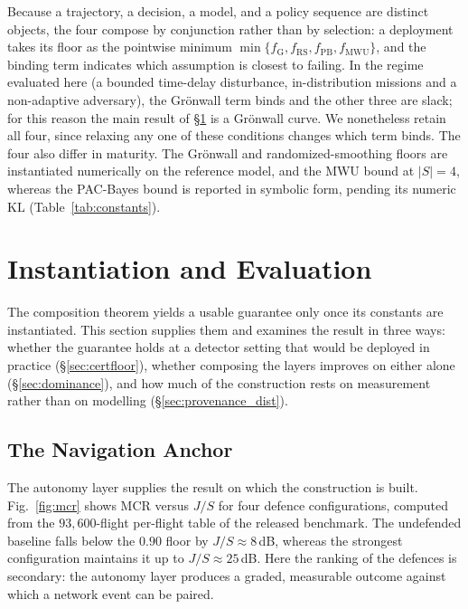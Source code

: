 Because a trajectory, a decision, a model, and a policy sequence are distinct
objects, the four compose by conjunction rather than by selection: a deployment
takes its floor as the pointwise minimum
$\min\{f_{\mathrm{G}},f_{\mathrm{RS}},f_{\mathrm{PB}},f_{\mathrm{MWU}}\}$, and
the binding term indicates which assumption is closest to failing. In the
regime evaluated here (a bounded time-delay disturbance, in-distribution
missions and a non-adaptive adversary), the Gr\"onwall term binds and the other
three are slack; for this reason the main result of \S\ref{sec:eval} is a
Gr\"onwall curve. We nonetheless retain all four, since relaxing any one of
these conditions changes which term binds. The four also differ in maturity.
The Gr\"onwall and randomized-smoothing floors are instantiated numerically on
the reference model, and the MWU bound at $|S|=4$, whereas the PAC-Bayes bound
is reported in symbolic form, pending its numeric $\mathrm{KL}$
(Table~\ref{tab:constants}).

\section{Instantiation and Evaluation}
\label{sec:eval}
The composition theorem yields a usable guarantee only once its constants are
instantiated. This section supplies them and examines the result in three ways: whether the guarantee holds at a detector setting that would be
deployed in practice (\S\ref{sec:certfloor}), whether composing the layers
improves on either alone (\S\ref{sec:dominance}), and how much of the
construction rests on measurement rather than on modelling
(\S\ref{sec:provenance_dist}).

\subsection{The Navigation Anchor}
The autonomy layer supplies the result on which the construction is built.
Fig.~\ref{fig:mcr} shows MCR versus $J/S$ for four defence configurations,
computed from the $93{,}600$-flight per-flight table of the released benchmark.
The undefended baseline falls below the $0.90$ floor by $J/S\!\approx\!8$\,dB,
whereas the strongest configuration maintains it up to $J/S\!\approx\!25$\,dB.
Here the ranking of the defences is secondary: the autonomy layer produces a
graded, measurable outcome against which a network event can be paired.

